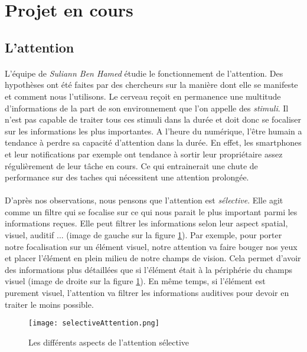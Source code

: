 \section{Projet en cours}

\subsection{L'attention}

\paragraph{}L'équipe de \emph{Suliann Ben Hamed} étudie le fonctionnement de l'attention. Des hypothèses ont été faites par des chercheurs sur la manière dont elle se manifeste et
comment nous l'utilisons. Le cerveau reçoit en permanence une multitude d'informations de la part de son environnement que l'on appelle des \emph{stimuli}. Il n'est pas capable de
traiter tous ces stimuli dans la durée et doit donc se focaliser sur les informations les plus importantes. A l'heure du numérique, l'être humain a tendance à perdre sa capacité
d'attention dans la durée. En effet, les smartphones et leur notifications par exemple ont tendance à sortir leur propriétaire assez régulièrement de leur tâche en cours. Ce qui
entrainerait une chute de performance sur des taches qui nécessitent une attention prolongée.

\paragraph{}D'après nos observations, nous pensons que l'attention est \emph{sélective}. Elle agit comme un filtre qui se focalise sur ce qui nous parait le plus important parmi les
informations reçues. Elle peut filtrer les informations selon leur aspect spatial, visuel, auditif ... (image de gauche sur la figure \ref{AspectSelectiveAttention}). Par exemple, pour
porter notre focalisation sur un élément visuel, notre attention va faire bouger nos yeux et placer l'élément en plein milieu de notre champs de vision. Cela permet d'avoir des
informations plus détaillées que si l'élément était à la périphérie du champs visuel (image de droite sur la figure \ref{AspectSelectiveAttention}). En même temps, si l'élément est
purement visuel, l'attention va filtrer les informations auditives pour devoir en traiter le moins possible.

\begin{figure}[h]
    \begin{center}
    \texttt{[image: selectiveAttention.png]}
    \end{center}
    \caption{Les différents aspects de l'attention sélective}
\label{AspectSelectiveAttention}
\end{figure}

